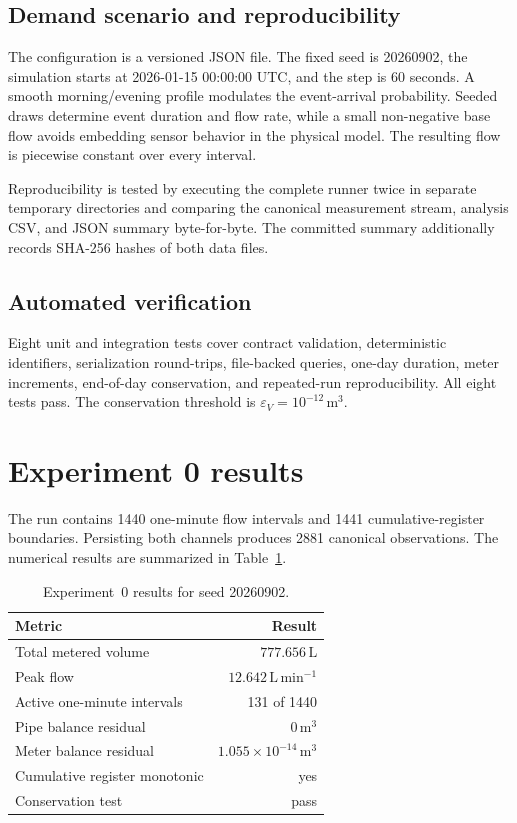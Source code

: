 \documentclass[11pt,a4paper]{article}
\begin{document}
\subsection{Demand scenario and reproducibility}
The configuration is a versioned JSON file. The fixed seed is 20260902, the
simulation starts at 2026-01-15 00:00:00 UTC, and the step is 60 seconds. A
smooth morning/evening profile modulates the event-arrival probability. Seeded
draws determine event duration and flow rate, while a small non-negative base
flow avoids embedding sensor behavior in the physical model. The resulting
flow is piecewise constant over every interval.

Reproducibility is tested by executing the complete runner twice in separate
temporary directories and comparing the canonical measurement stream, analysis
CSV, and JSON summary byte-for-byte. The committed summary additionally records
SHA-256 hashes of both data files.

\subsection{Automated verification}
Eight unit and integration tests cover contract validation, deterministic
identifiers, serialization round-trips, file-backed queries, one-day duration,
meter increments, end-of-day conservation, and repeated-run reproducibility.
All eight tests pass. The conservation threshold is
$\varepsilon_V=10^{-12}\,\mathrm{m^3}$.

\section{Experiment 0 results}
The run contains 1440 one-minute flow intervals and 1441 cumulative-register
boundaries. Persisting both channels produces 2881 canonical observations. The
numerical results are summarized in Table~\ref{tab:results}.

\begin{table}[htbp]
  \centering
  \caption{Experiment~0 results for seed 20260902.}
  \label{tab:results}
  \begin{tabular}{lr}
    \toprule
    Metric & Result \\
    \midrule
    Total metered volume & $777.656\,\mathrm{L}$ \\
    Peak flow & $12.642\,\mathrm{L\,min^{-1}}$ \\
    Active one-minute intervals & 131 of 1440 \\
    Pipe balance residual & $0\,\mathrm{m^3}$ \\
    Meter balance residual & $1.055\times10^{-14}\,\mathrm{m^3}$ \\
    Cumulative register monotonic & yes \\
    Conservation test & pass \\
    \bottomrule
  \end{tabular}
\end{table}
\end{document}
